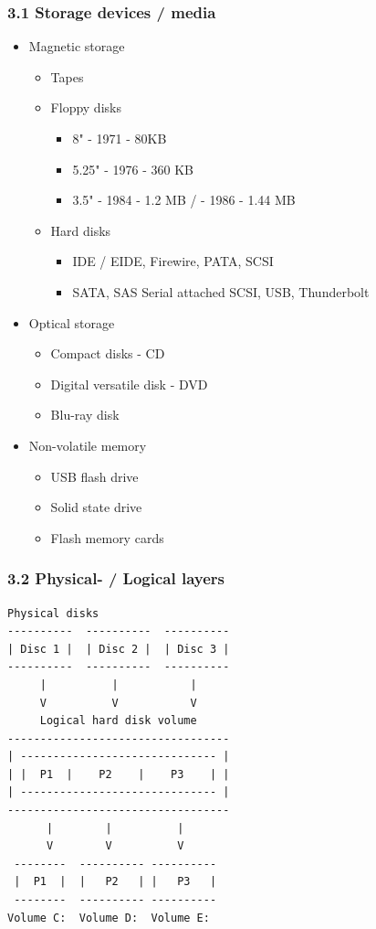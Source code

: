 \begin{frame}[fragile]
  \frametitle{3.1 Storage devices / media}
    \begin{itemize}
        \item Magnetic storage
        \begin{itemize}
            \item Tapes
            \item Floppy disks
            \begin{itemize}
                \item 8" - 1971 - 80KB
                \item 5.25" - 1976 - 360 KB
                \item 3.5" - 1984 - 1.2 MB / - 1986 - 1.44 MB
            \end{itemize}
            \item Hard disks
            \begin{itemize}
                \item IDE / EIDE, Firewire, PATA, SCSI
                \item SATA, SAS Serial attached SCSI, USB, Thunderbolt
            \end{itemize}
        \end{itemize}
        \item Optical storage
        \begin{itemize}
            \item Compact disks - CD
            \item Digital versatile disk - DVD
            \item Blu-ray disk
        \end{itemize}
        \item Non-volatile memory
        \begin{itemize}
            \item USB flash drive
            \item Solid state drive
            \item Flash memory cards
        \end{itemize}
    \end{itemize}
\end{frame}


\begin{frame}[fragile]
  \frametitle{3.2 Physical- / Logical layers}
  \begin{lstlisting}[basicstyle=\tiny]
	  Physical disks
----------  ----------  ----------
| Disc 1 |  | Disc 2 |  | Disc 3 |
----------  ----------  ----------
     |          |           |
     V          V           V
     Logical hard disk volume
----------------------------------
| ------------------------------ |
| |  P1  |    P2    |    P3    | |
| ------------------------------ |
----------------------------------
      |        |          |
      V        V          V
 --------  ---------- ----------
 |  P1  |  |   P2   | |   P3   |
 --------  ---------- ----------
Volume C:  Volume D:  Volume E:
  \end{lstlisting}
\end{frame}


